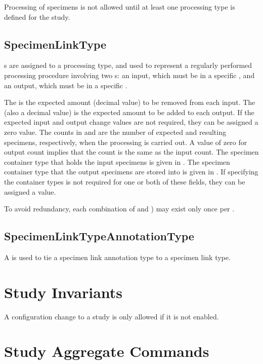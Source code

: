 Processing of specimens is not allowed until at least one processing type is
defined for the study.

\subsection*{SpecimenLinkType}
s are assigned to
a processing type, and used to represent a regularly performed processing
procedure involving two s: an input, which must be in a
specific , and an output, which must be in a specific
.

The  is the expected amount (decimal value) to be
removed from each input. The  (also a decimal
value) is the expected amount to be added to each output. If the expected input
and output change values are not required, they can be assigned a zero value.
The counts in  and  are the number of
expected and resulting specimens, respectively, when the processing is carried
out. A value of zero for output count implies that the count is the same as the
input count. The specimen container type that holds the input specimens is
given in . The specimen container type that the
output specimens are stored into is given in . If
specifying the container types is not required for one or both of these fields,
they can be assigned a  value.

To avoid redundancy, each combination of  and
) may exist only once per .

\subsection*{SpecimenLinkTypeAnnotationType}

A  is used to tie a specimen
link annotation type to a specimen link type.

\section{Study Invariants}
A configuration change to a study is only allowed if it is not enabled.

\section {Study Aggregate Commands}
